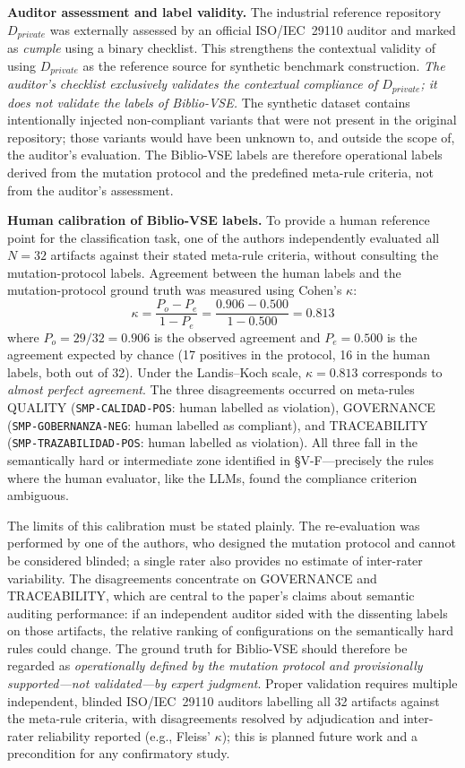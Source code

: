 \documentclass{ieeeaccess}
\begin{document}
\textbf{Auditor assessment and label validity.} The industrial reference repository $D_{private}$ was externally assessed by an official ISO/IEC~29110 auditor and marked as \emph{cumple} using a binary checklist. This strengthens the contextual validity of using $D_{private}$ as the reference source for synthetic benchmark construction. \emph{The auditor's checklist exclusively validates the contextual compliance of $D_{private}$; it does not validate the labels of Biblio-VSE.} The synthetic dataset contains intentionally injected non-compliant variants that were not present in the original repository; those variants would have been unknown to, and outside the scope of, the auditor's evaluation. The Biblio-VSE labels are therefore operational labels derived from the mutation protocol and the predefined meta-rule criteria, not from the auditor's assessment.

\textbf{Human calibration of Biblio-VSE labels.} To provide a human reference point for the classification task, one of the authors independently evaluated all $N=32$ artifacts against their stated meta-rule criteria, without consulting the mutation-protocol labels. Agreement between the human labels and the mutation-protocol ground truth was measured using Cohen's $\kappa$:
\begin{equation}
\kappa = \frac{P_o - P_e}{1 - P_e} = \frac{0.906 - 0.500}{1 - 0.500} = 0.813
\label{eq:kappa}
\end{equation}
where $P_o = 29/32 = 0.906$ is the observed agreement and $P_e = 0.500$ is the agreement expected by chance (17 positives in the protocol, 16 in the human labels, both out of 32). Under the Landis--Koch scale, $\kappa = 0.813$ corresponds to \emph{almost perfect agreement}. The three disagreements occurred on meta-rules QUALITY (\texttt{SMP-CALIDAD-POS}: human labelled as violation), GOVERNANCE (\texttt{SMP-GOBERNANZA-NEG}: human labelled as compliant), and TRACEABILITY (\texttt{SMP-TRAZABILIDAD-POS}: human labelled as violation). All three fall in the semantically hard or intermediate zone identified in §V-F---precisely the rules where the human evaluator, like the LLMs, found the compliance criterion ambiguous.

The limits of this calibration must be stated plainly. The re-evaluation was performed by one of the authors, who designed the mutation protocol and cannot be considered blinded; a single rater also provides no estimate of inter-rater variability. The disagreements concentrate on GOVERNANCE and TRACEABILITY, which are central to the paper's claims about semantic auditing performance: if an independent auditor sided with the dissenting labels on those artifacts, the relative ranking of configurations on the semantically hard rules could change. The ground truth for Biblio-VSE should therefore be regarded as \emph{operationally defined by the mutation protocol and provisionally supported---not validated---by expert judgment}. Proper validation requires multiple independent, blinded ISO/IEC~29110 auditors labelling all 32 artifacts against the meta-rule criteria, with disagreements resolved by adjudication and inter-rater reliability reported (e.g., Fleiss' $\kappa$); this is planned future work and a precondition for any confirmatory study.
\end{document}

